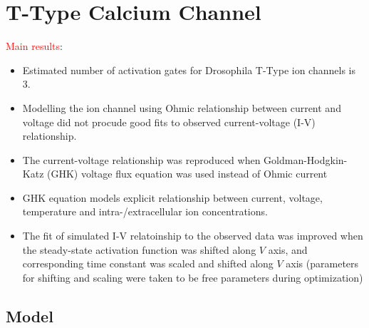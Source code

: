 \documentclass[../../workflow.tex]{subfiles}
\begin{document}
\section{T-Type Calcium Channel}
\etocignoretoctocdepth %
\etocsettocstyle{\subsection*{\contentsname}}{}
\localtableofcontents


\newpage
\color{orange}

\textcolor{red}{Main results}:
\begin{itemize}
    \item Estimated number of activation gates for Drosophila T-Type ion channels is 3.
    \item Modelling the ion channel using Ohmic relationship between current and voltage
    did not procude good fits to observed current-voltage (I-V) relationship.
    \item The current-voltage relationship was reproduced when
    Goldman-Hodgkin-Katz (GHK) voltage flux equation was used instead of Ohmic current
    \item GHK equation models explicit relationship between current, voltage, temperature and
    intra-/extracellular ion concentrations.
    \item The fit of simulated I-V relatoinship to the observed data was improved when
    the steady-state activation function was shifted along $V$ axis,
    and corresponding time constant was scaled and shifted along $V$ axis (parameters for
    shifting and scaling were taken to be free parameters during optimization)
\end{itemize}

\color{black}

\subsection{Model}
\end{document}
